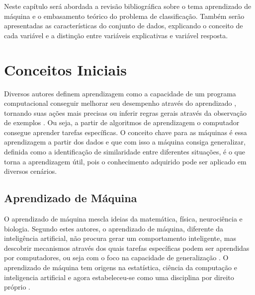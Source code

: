 Neste capítulo será abordada a revisão bibliográfica sobre o tema aprendizado de máquina e o embasamento teórico do problema de classificação. Também serão apresentadas as características do conjunto de dados, explicando o conceito de cada variável e a distinção entre variáveis explicativas e variável resposta.

\section{Conceitos Iniciais}
Diversos autores definem aprendizagem como a capacidade de um programa computacional conseguir melhorar seu desempenho através do aprendizado \cite{hastie} \cite{mitchell}, tornando suas ações mais precisas \cite{marsland} ou inferir regras gerais através da observação de exemplos \cite{luxburg:artigo}. Ou seja, a partir de algoritmos de aprendizagem  o computador consegue aprender tarefas específicas. O conceito chave para as máquinas é essa aprendizagem a partir dos dados e que com isso a máquina consiga generalizar, definida como a identificação
de similaridade entre diferentes situações, é o que torna a aprendizagem útil, pois o conhecimento adquirido pode ser aplicado em diversos cenários. 

\subsection{Aprendizado de Máquina}
O aprendizado de máquina mescla ideias da matemática, física, neurociência e biologia. Segundo estes autores, o aprendizado de máquina, diferente da inteligência artificial, não procura gerar um comportamento inteligente, mas descobrir mecanismos através dos quais tarefas específicas podem ser aprendidas por computadores, ou seja com o foco na capacidade de generalização \cite{hastie} \cite{marsland}.
O aprendizado de máquina tem origens na estatística, ciência da computação e inteligencia artificial e agora estabeleceu-se como uma disciplina por direito próprio \cite{luxburg:artigo}.


